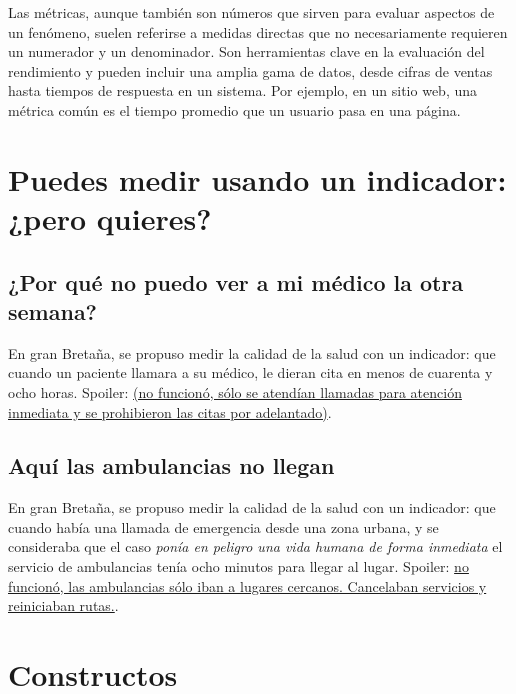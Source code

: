 \documentclass[
  letterpaper,
  DIV=11,
  numbers=noendperiod]{scrreprt}
\begin{document}
Las métricas, aunque también son números que sirven para evaluar
aspectos de un fenómeno, suelen referirse a medidas directas que no
necesariamente requieren un numerador y un denominador. Son herramientas
clave en la evaluación del rendimiento y pueden incluir una amplia gama
de datos, desde cifras de ventas hasta tiempos de respuesta en un
sistema. Por ejemplo, en un sitio web, una métrica común es el tiempo
promedio que un usuario pasa en una página.

\section{Puedes medir usando un indicador: ¿pero
quieres?}\label{puedes-medir-usando-un-indicador-pero-quieres}

\subsection{¿Por qué no puedo ver a mi médico la otra
semana?}\label{por-quuxe9-no-puedo-ver-a-mi-muxe9dico-la-otra-semana}

En gran Bretaña, se propuso medir la calidad de la salud con un
indicador: que cuando un paciente llamara a su médico, le dieran cita en
menos de cuarenta y ocho horas. Spoiler:
\href{https://www.standard.co.uk/news/mother-catches-out-blair-over-gps-7272924.html}{(no
funcionó, sólo se atendían llamadas para atención inmediata y se
prohibieron las citas por adelantado)}.

\subsection{Aquí las ambulancias no
llegan}\label{aquuxed-las-ambulancias-no-llegan}

En gran Bretaña, se propuso medir la calidad de la salud con un
indicador: que cuando había una llamada de emergencia desde una zona
urbana, y se consideraba que el caso \emph{ponía en peligro una vida
humana de forma inmediata} el servicio de ambulancias tenía ocho minutos
para llegar al lugar. Spoiler:
\href{https://www.ncbi.nlm.nih.gov/pmc/articles/PMC2667302/pdf/rssa0172-0161.pdf}{no
funcionó, las ambulancias sólo iban a lugares cercanos. Cancelaban
servicios y reiniciaban rutas.}.

\section{Constructos}\label{constructos}
\end{document}
